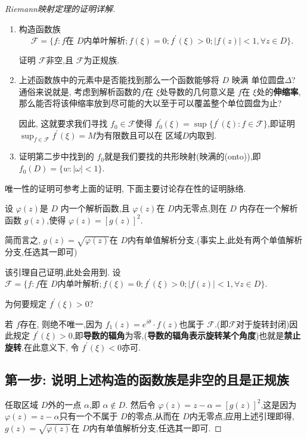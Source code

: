 \begin{proof}[Riemann映射定理的证明详解]
    \begin{remark}[思路点拨]
        \begin{enumerate}[label=Step.\Roman*]
            \item 构造函数族 
            \[\mathscr{F}=\{f\colon f\text{在 $D$内单叶解析};  f(\xi)=0; f^\prime (\xi)>0; |f(z)|<1, \forall z\in D\}.\]

            证明 $\mathscr{F}$非空,且 $\mathscr{F}$为正规族.
            \item 上述函数族中的元素中是否能找到那么一个函数能够将 $D$ 映满 单位圆盘$\Delta$? 通俗来说就是, 考虑到解析函数的$f$在 $\xi$处导数的几何意义是 $f$在 $\xi$处的\textbf{伸缩率},那么能否将该伸缩率放到尽可能的大以至于可以覆盖整个单位圆盘为止?

            因此, 这就要求我们寻找 $f_0\in\mathscr{F}$使得 $f_0^\prime(\xi)=\sup\{f^\prime(\xi)\colon f\in\mathscr{F}\}$,即证明 $\sup_{f\in\mathscr{F}}f^\prime (\xi)=M$为有限数且可以在 区域$D$内取到.
            \item 证明第二步中找到的 $f_0$就是我们要找的共形映射(映满的(onto)),即 $f_0(D)=\{w\colon |\omega|<1\}$.
        \end{enumerate}
    \end{remark}
    唯一性的证明可参考上面的证明, 下面主要讨论存在性的证明脉络.

    \begin{lem}
        设 $\varphi(z)$是 $D$ 内一个解析函数,且 $\varphi(z)$在 $D$内无零点,则在 $D$ 内存在一个解析函数 $g(z)$,使得 $\varphi(z)=[g(z)]^2$.

        简而言之, $g(z)=\sqrt{\varphi(z)}$在 $D$内有单值解析分支.(事实上,此处有两个单值解析分支,任选其一即可)
    \end{lem}
    该引理自己证明,此处会用到.
    设$\mathscr{F}=\{f\colon f\text{在 $D$内单叶解析};  f(\xi)=0; f^\prime (\xi)>0; |f(z)|<1, \forall z\in D\}$.
    \begin{remark}[释疑解惑 I]
        为何要规定 $f^\prime(\xi)>0$?

        若 $f$存在, 则绝不唯一,因为 $f_1(z)=e^{i\theta}\cdot f(z)$也属于 $\mathscr{F}$.(即$\mathscr{F}$对于旋转封闭)因此规定 $f^\prime(\xi)>0$,即\textbf{导数的辐角}为零,(\textbf{导数的辐角表示旋转某个角度})也就是\textbf{禁止旋转}.在此意义下, 令 $f^\prime(\xi)<0$亦可.
    \end{remark}
\subsection{第一步: 说明上述构造的函数族是非空的且是正规族}\label{subsec:setp1}
        任取区域 $D$外的一点 $\alpha$,即 $\alpha\not\in D$. 然后令 $\varphi(z)=z-\alpha=[g(z)]^2$,这是因为 $\varphi(z)=z-\alpha$只有一个不属于 $D$的零点,从而在 $D$内无零点,应用上述引理即得, $g(z)=\sqrt{\varphi(z)}$在 $D$内有单值解析分支,任选其一即可.


\end{proof}
